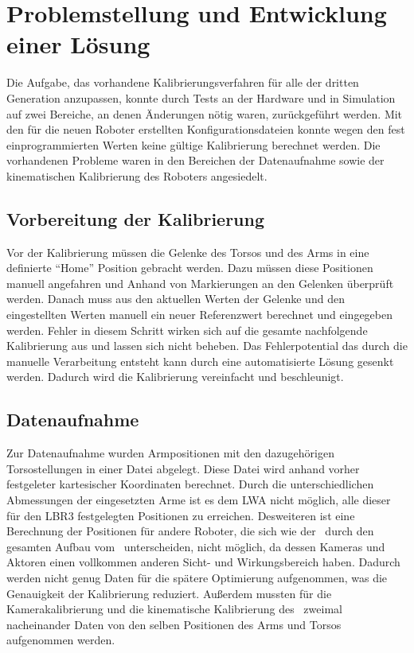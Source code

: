 \chapter{Problemstellung und Entwicklung einer Lösung}

Die Aufgabe, das vorhandene Kalibrierungsverfahren für alle \cob der dritten 
Generation anzupassen, konnte durch Tests an der Hardware und in Simulation 
auf zwei Bereiche, an denen Änderungen nötig waren, zurückgeführt werden. 
Mit den für die neuen Roboter erstellten Konfigurationsdateien konnte wegen
den fest einprogrammierten Werten keine gültige Kalibrierung berechnet werden.
Die vorhandenen Probleme waren in den Bereichen der Datenaufnahme
sowie der kinematischen Kalibrierung des Roboters angesiedelt. 

\section{Vorbereitung der Kalibrierung}
\label{sec:Vorbereitung der Kalibrierung}
Vor der Kalibrierung müssen die Gelenke des Torsos und des Arms in eine definierte
``Home'' Position gebracht werden. Dazu müssen diese Positionen manuell angefahren
und Anhand von Markierungen an den Gelenken überprüft werden. Danach muss aus 
den aktuellen Werten der Gelenke und den eingestellten Werten manuell ein neuer
Referenzwert berechnet und eingegeben werden. Fehler in diesem Schritt wirken 
sich auf die gesamte nachfolgende Kalibrierung aus und lassen sich nicht beheben.
Das Fehlerpotential das durch die manuelle Verarbeitung entsteht kann durch 
eine automatisierte Lösung gesenkt werden. Dadurch wird die Kalibrierung 
vereinfacht und beschleunigt.
\section{Datenaufnahme} %

\label{sec:Datenaufnahme}


Zur Datenaufnahme
wurden Armpositionen mit den dazugehörigen Torsostellungen in einer Datei 
abgelegt. Diese Datei wird anhand vorher festgeleter kartesischer Koordinaten
berechnet. Durch die unterschiedlichen Abmessungen der eingesetzten Arme 
ist es dem \ac{LWA} nicht möglich, alle dieser für den \ac{LBR3} festgelegten 
Positionen zu erreichen. Desweiteren ist eine Berechnung der Positionen
für andere Roboter, die sich wie der \raw\ durch den gesamten Aufbau vom 
\cob\ unterscheiden, nicht möglich, da dessen Kameras und Aktoren einen vollkommen
anderen Sicht- und Wirkungsbereich haben. Dadurch werden nicht genug Daten für die spätere 
Optimierung aufgenommen, was die Genauigkeit der Kalibrierung reduziert.
Außerdem mussten für die Kamerakalibrierung und die kinematische Kalibrierung 
des \cob\ zweimal nacheinander Daten von den selben Positionen des Arms und Torsos
aufgenommen werden.

